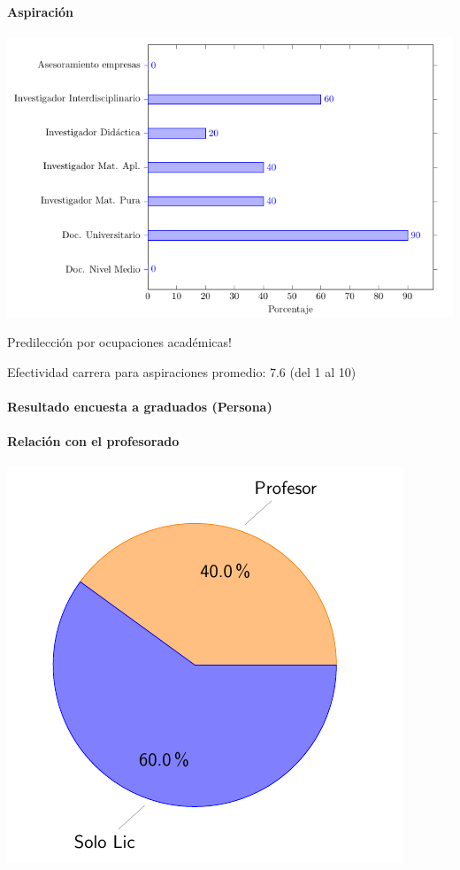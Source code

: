 \documentclass[a4paper,10pt,BCOR10mm,oneside,headsepline]{scrbook}
\begin{document}
\paragraph{Aspiración }
\includegraphics[scale=.5]{barras9.png}

Predilección por ocupaciones académicas!

Efectividad carrera para aspiraciones promedio: 7.6 (del 1 al 10)




\paragraph{Resultado encuesta a graduados (Persona)}
\paragraph{Relación con el profesorado }
\includegraphics[scale=.4]{torta3.png}
\end{document}
